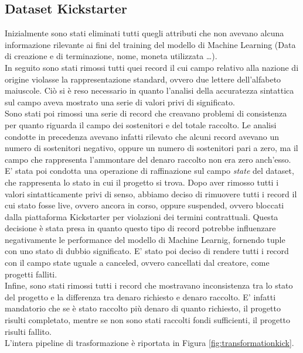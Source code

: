 \subsection{Dataset Kickstarter}
Inizialmente sono stati eliminati tutti quegli attributi che non avevano alcuna informazione rilevante ai fini del training del modello di Machine Learning (Data di creazione e di terminazione, nome, moneta utilizzata \dots).\\
In seguito sono stati rimossi tutti quei record il cui campo relativo alla nazione di origine violasse la rappresentazione standard, ovvero due lettere dell'alfabeto maiuscole. Ciò si è reso necessario in quanto l'analisi della accuratezza sintattica sul campo aveva mostrato una serie di valori privi di significato.\\
Sono stati poi rimossi una serie di record che creavano problemi di consistenza per quanto riguarda il campo dei sostenitori e del totale raccolto. Le analisi condotte in precedenza avevano infatti rilevato che alcuni record avevano un numero di sostenitori negativo, oppure un numero di sostenitori pari a zero, ma il campo che rappresenta l'ammontare del denaro raccolto non era zero anch'esso.\\
E' stata poi condotta una operazione di raffinazione sul campo \textit{state} del dataset, che rappresenta lo stato in cui il progetto si trova. Dopo aver rimosso tutti i valori sintatticamente privi di senso, abbiamo deciso di rimuovere tutti i record il cui stato fosse live, ovvero ancora in corso, oppure suspended, ovvero bloccati dalla piattaforma Kickstarter per violazioni dei termini contrattuali. Questa decisione è stata presa in quanto questo tipo di record potrebbe influenzare negativamente le performance del modello di Machine Learnig, fornendo tuple con uno stato di dubbio significato.
E' stato poi deciso di rendere tutti i record con il campo state uguale a canceled, ovvero cancellati dal creatore, come progetti falliti.\\
Infine, sono stati rimossi tutti i record che mostravano inconsistenza tra lo stato del progetto e la differenza tra denaro richiesto e denaro raccolto. E' infatti mandatorio che se è stato raccolto più denaro di quanto richiesto, il progetto risulti completato, mentre se non sono stati raccolti fondi sufficienti, il progetto risulti fallito.\\
L'intera pipeline di trasformazione è riportata in Figura \ref{fig:transformationkick}.


